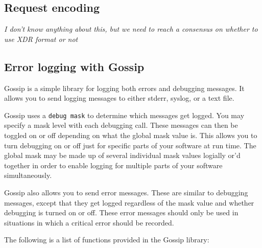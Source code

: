 \documentclass[11pt, letterpaper]{article}
\begin{document}
\subsection{Request encoding}

\emph{I don't know anything about this, but we need to reach a consensus
on whether to use XDR format or not}

\subsection{Error logging with Gossip}

Gossip is a simple library for logging both errors and debugging messages.
It allows you to send logging messages to either stderr, syslog, or a
text file.  

Gossip uses a {\tt debug mask} to determine which messages get logged.
You may specify a mask level with each debugging call.  These messages
can then be toggled on or off depending on what the global mask value
is.  This allows you to turn debugging on or off just for specific parts of
your software at run time.  The global mask may be made up of several
individual mask values logially or'd together in order to enable logging for
multiple parts of your software simultaneously.

Gossip also allows you to send error messages.  These are similar to
debugging messages, except that they get logged regardless of the mask
value and whether debugging is turned on or off.  These error messages
should only be used in situations in which a critical error should be
recorded.

The following is a list of functions provided in the Gossip library:
\end{document}
